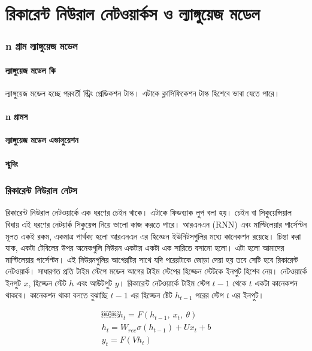 \chapter{রিকারেন্ট নিউরাল নেটওয়ার্কস ও ল্যাঙ্গুয়েজ মডেল}
\subsection{n গ্রাম ল্যাঙ্গুয়েজ মডেল}
\subsubsection{ল্যাঙ্গুয়েজ মডেল কি}
ল্যাঙ্গুয়েজ মডেল হচ্ছে পরবর্তী স্ট্রিং প্রেডিকশন টাস্ক। এটাকে ক্লাসিফিকেশন টাস্ক হিশেবে ভাবা যেতে পারে।
\subsubsection{n গ্রামস}
\subsubsection{ল্যাঙ্গুয়েজ মডেল এভালুয়েশন}
\subsubsection{স্মুদিং}

\subsection{রিকারেন্ট নিউরাল নেটস}
রিকারেন্ট নিউরাল নেটওয়ার্কে \cite{6302929} এক ধরণের চেইন থাকে। এটাকে ফিডব্যাক লুপ বলা হয়। চেইন বা সিকুয়েন্সিয়াল বিধায় এই ধরণের নেটয়ার্ক সিকুয়েন্স নিয়ে ভালো কাজ করতে পারে। 
আরএনএন (RNN) এবং মাল্টিলেয়ার পার্সেপ্টন মূলত একই রকম, একমাত্র পার্থক্য হলো আরএনএন এর হিড্ডেন ইউনিটসগুলির মধ্যে কানেকশন রয়েছে।
চিন্তা করা যাক, একটা টেবিলের উপর অনেকগুলি নিউরন একটার একটা এক সারিতে বসানো হলো। এটা হলো আমাদের মাল্টিলেয়ার পার্সেপ্টন।
এই নিউরনগুলির আগেরটির সাথে যদি পরেরটাকে জোড়া দেয়া হয় তবে সেটি হবে রিকারেন্ট নেটওয়ার্ক। 
সাধারণত প্রতি টাইম স্টেপে মডেল আগের টাইম স্টেপের হিড্ডেন স্টেটকে ইনপুট হিশেব নেয়। নেটওয়ার্কে ইনপুট $x$, হিড্ডেন স্টেট $h$ এবং আউটপুট $y$। 
রিকারেন্ট নেটওয়ার্কে টাইম স্টেপ  $t-1$ থেকে $t$ একটা কানেকশন থাকবে। কানেকশন থাকা বলতে বুঝাচ্ছি $t-1$ এর হিড্ডেন ষ্টেট $h_{t-1}$ পরের স্টেপ $t$ এর ইনপুট। 

\begin{align} %
  ￼￼h_t = F(h_{t−1}, \ x_t, \ θ)\\
  h_t = W_{rec} \sigma (h_{t−1}) + U x_t + b \\ 
  y_t = F(V h_t)
\end{align}

